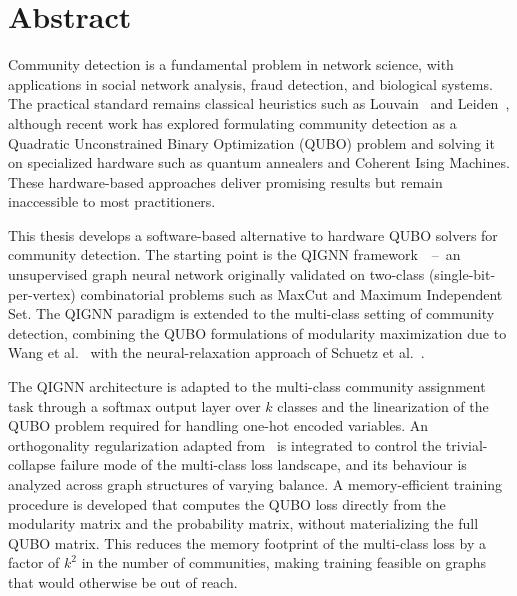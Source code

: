 
\section*{Abstract}

Community detection is a fundamental problem in network science,
with applications in social network analysis, fraud detection, and
biological systems. The practical standard remains classical
heuristics such as Louvain~\cite{blondel2008louvain} and
Leiden~\cite{traag2019leiden}, although recent work has explored
formulating community detection as a Quadratic Unconstrained Binary
Optimization (QUBO) problem and solving it on specialized hardware
such as quantum annealers and Coherent Ising Machines. These
hardware-based approaches deliver promising results but remain
inaccessible to most practitioners.

This thesis develops a software-based alternative to hardware QUBO
solvers for community detection. The starting point is the QIGNN
framework~\cite{qignn2026}~--~an unsupervised graph neural network
originally validated on two-class (single-bit-per-vertex) combinatorial problems such as
MaxCut and Maximum Independent Set. The QIGNN paradigm is extended
to the multi-class setting of community detection, combining the
QUBO formulations of modularity maximization due to Wang et
al.~\cite{wang2024quantum} with the neural-relaxation approach of
Schuetz et al.~\cite{schuetz2022combinatorial}.

The QIGNN architecture is adapted to the multi-class community
assignment task through a softmax output layer over $k$ classes and
the linearization of the QUBO problem required for handling one-hot
encoded variables. An orthogonality regularization adapted
from~\cite{bianchi2020spectral} is integrated to control the
trivial-collapse failure mode of the multi-class loss landscape, and
its behaviour is analyzed across graph structures of varying
balance. A memory-efficient training procedure is developed that
computes the QUBO loss directly from the modularity matrix and the
probability matrix, without materializing the full QUBO matrix. This
reduces the memory footprint of the multi-class loss by a factor of
$k^{2}$ in the number of communities, making training feasible on
graphs that would otherwise be out of reach.

